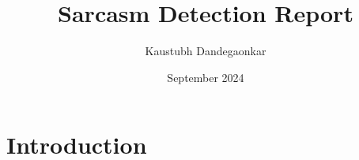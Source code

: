 \documentclass{article}
\title{Sarcasm Detection Report}
\author{Kaustubh Dandegaonkar}
\date{September 2024}
\begin{document}
\maketitle

\section{Introduction}
\end{document}

